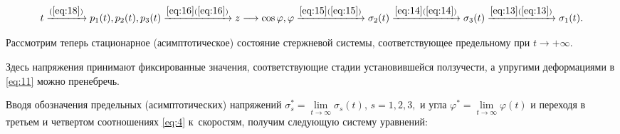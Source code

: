 \begin{equation}

\label{eq:19}

t

\xrightarrow{(\ref{eq:18})} 


p_1(t), p_2(t), p_3(t) 

\xrightarrow{\eqref{eq:16}(\ref{eq:16})}


z

\longrightarrow

\cos{\varphi}, \varphi

\xrightarrow{\eqref{eq:15}(\ref{eq:15})}


\sigma_{2} (t)

\xrightarrow{\eqref{eq:14}(\ref{eq:14})}


\sigma_{3} (t)

\xrightarrow{\eqref{eq:13}(\ref{eq:13})}


\sigma_{1} (t).

\end{equation}



Рассмотрим теперь стационарное (асимптотическое) состояние стержневой системы, соответствующее предельному при $t \to +\infty$.

Здесь напряжения принимают фиксированные значения, соответствующие стадии установившейся ползучести, а упругими деформациями в \eqref{eq:11} можно пренебречь.

Вводя обозначения предельных (асимптотических) напряжений $\sigma_s^{\ast} = \lim \limits_{t \to \infty} \sigma_s (t)$, $s=1,2,3,$ и угла $\varphi^{\ast} = \lim \limits_{t \to \infty} \varphi (t)$ и переходя в третьем и четвертом соотношениях \eqref{eq:4} к~скоростям, получим следующую систему уравнений:

